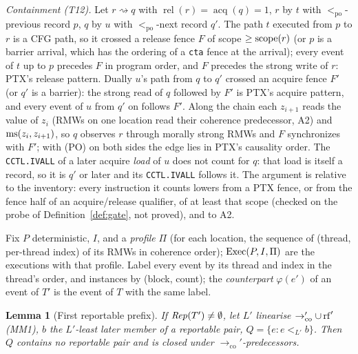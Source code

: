 \documentclass[11pt]{article}
\newtheorem{lemma}[theorem]{Lemma}
\theoremstyle{remark}
\DeclareMathOperator{\rel}{rel}\DeclareMathOperator{\acq}{acq}\DeclareMathOperator{\key}{key}
\newcommand{\PO}{<_{\mathrm{po}}}\newcommand{\HB}{\to_{\mathrm{hb}}}\newcommand{\HBr}{\trianglelefteq_{\mathrm{hb}}}
\newcommand{\CO}{\to_{\mathrm{co}}}\newcommand{\chain}{\rightsquigarrow}
\begin{document}
\emph{Containment (T12).} Let $r\chain q$ with $\rel(r)=\acq(q)=1$, $r$ by $t$ with
$\PO$-previous record $p$, $q$ by $u$ with $\PO$-next record $q'$. The path $t$ executed from
$p$ to $r$ is a CFG path, so it crossed a release fence $F$ of scope $\ge\operatorname{scope}(r)$ (or $p$ is a
barrier arrival, which has the ordering of a \texttt{cta} fence at the arrival); every event of
$t$ up to $p$ precedes $F$ in program order, and $F$ precedes the strong write of $r$: PTX's
release pattern. Dually $u$'s path from $q$ to $q'$ crossed an acquire fence $F'$ (or $q'$ is a
barrier): the strong read of $q$ followed by $F'$ is PTX's acquire pattern, and every event of
$u$ from $q'$ on follows $F'$. Along the chain each $z_{i+1}$ reads the value of $z_i$ (RMWs on
one location read their coherence predecessor, A2) and $\operatorname{ms}(z_i,z_{i+1})$, so $q$ observes $r$
through morally strong RMWs and $F$ synchronizes with $F'$; with (PO) on both sides the edge
lies in PTX's causality order. The \texttt{CCTL.IVALL} of a later acquire \emph{load} of $u$
does not count for $q$: that load is itself a record, so it is $q'$ or later and its
\texttt{CCTL.IVALL} follows it. The argument is relative to the inventory: every instruction it
counts lowers from a PTX fence, or from the fence half of an acquire/release qualifier, of at
least that scope (checked on the probe of Definition~\ref{def:gate}, not proved), and to A2.

Fix $P$ deterministic, $I$, and a \emph{profile} $\Pi$ (for each location, the sequence
of (thread, per-thread index) of its RMWs in coherence order); $\operatorname{Exec}(P,I,\Pi)$ are the
executions with that profile. Label every event by its thread and index in the thread's
order, and instances by (block, count); the \emph{counterpart} $\varphi(e')$ of an event of
$T'$ is the event of $T$ with the same label.

\begin{lemma}[First reportable prefix]\label{lem:first}
If $\mathit{Rep}(T')\ne\emptyset$, let $L'$ linearise $\CO'\cup\rf'$ (MM1), $b$ the $L'$-least later
member of a reportable pair, $Q=\{e:e<_{L'}b\}$. Then $Q$ contains no reportable pair and
is closed under $\CO'$-predecessors.
\end{lemma}
\end{document}
